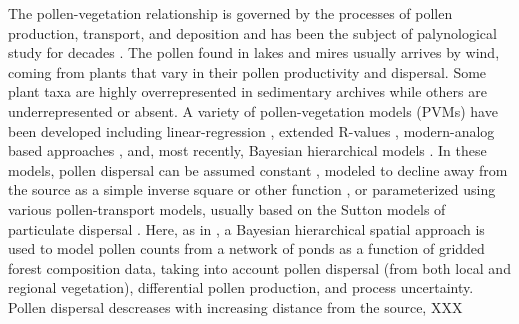\documentclass[12pt]{article}
\begin{document}
The pollen-vegetation relationship is governed by the processes of
pollen production, transport, and deposition and has been the subject
of palynological study for decades \citep{tauber1965,
  jacobson1981selection, jackson1994pollen, jackson1999pollen,
  sugita2007theory1, sugita2007theory2, prentice1988records}. The
pollen found in lakes and mires usually arrives by wind, coming from
plants that vary in their pollen productivity and dispersal. Some
plant taxa are highly overrepresented in sedimentary archives while
others are underrepresented or absent. A variety of pollen-vegetation
models (PVMs) have been developed including linear-regression
\citep{webb1981estimating, bradshaw1985relationships}, extended
R-values \citep{parsons1981statistical, sugita1994pollen,
  sugita2007theory1, sugita2007theory2}, modern-analog based
approaches \citep{overpeck1985quantitative, williams2003variations},
and, most recently, Bayesian hierarchical models
\citep{paciorek2009mapping, garreta2010method}.  In these models,
pollen dispersal can be assumed constant \citep{davis1963theory,
  parsons1981statistical}, modeled to decline away from the source as
a simple inverse square or other function \citep{webb1981estimating,
  calcote1995pollen, jackson1998quantitative}, or parameterized using
various pollen-transport models, usually based on the Sutton models of
particulate dispersal \citep{prentice1988records, sugita2007theory1,
  sugita2007theory2, jackson1999pollen}. Here, as in
\citet{paciorek2009mapping}, a Bayesian hierarchical spatial approach
is used to model pollen counts from a network of ponds as a function
of gridded forest composition data, taking into account pollen
dispersal (from both local and regional vegetation), differential
pollen production, and process uncertainty. Pollen dispersal
descreases with increasing distance from the source, XXX


\end{document}

